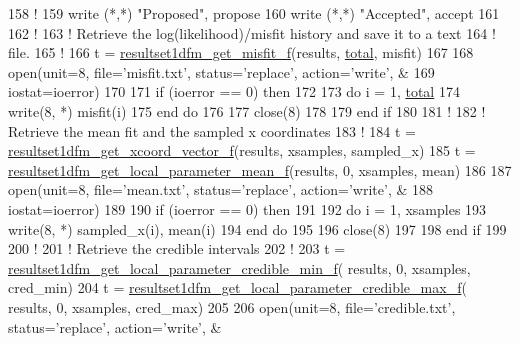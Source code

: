 \begin{DoxyCodeInclude}
158 \textcolor{comment}{!}
159 \textcolor{keyword}{write} (*,*) \textcolor{stringliteral}{"Proposed"}, propose
160 \textcolor{keyword}{write} (*,*) \textcolor{stringliteral}{"Accepted"}, accept
161 
162 \textcolor{comment}{!}
163 \textcolor{comment}{! Retrieve the log(likelihood)/misfit history and save it to a text}
164 \textcolor{comment}{! file.}
165 \textcolor{comment}{!}
166 t = \hyperlink{resultset1dfm_8c_aefdeb8e7e1fce2390b1c954f87351487}{resultset1dfm\_get\_misfit\_f}(results, \hyperlink{rjmcmcf__mpi_8h_a1829e955eab35ef63200105c2de1ad94}{total}, misfit)
167 
168 \textcolor{keyword}{open}(unit=8, file=\textcolor{stringliteral}{'misfit.txt'}, status=\textcolor{stringliteral}{'replace'}, action=\textcolor{stringliteral}{'write'}, &
169      iostat=ioerror)
170 
171 \textcolor{keywordflow}{if} (ioerror == 0) \textcolor{keywordflow}{then}
172 
173 \textcolor{keywordflow}{do} i = 1, \hyperlink{rjmcmcf__mpi_8h_a1829e955eab35ef63200105c2de1ad94}{total}
174    \textcolor{keyword}{write}(8, *) misfit(i)
175 \textcolor{keywordflow}{end do}
176 
177 \textcolor{keyword}{close}(8)
178 
179 \textcolor{keywordflow}{end if}
180 
181 \textcolor{comment}{!}
182 \textcolor{comment}{! Retrieve the mean fit and the sampled x coordinates}
183 \textcolor{comment}{!}
184 t = \hyperlink{resultset1dfm_8c_a45917b3be743e2d8371de4ff6e133d1b}{resultset1dfm\_get\_xcoord\_vector\_f}(results, xsamples, sampled\_x)
185 t = \hyperlink{resultset1dfm_8c_a91912167e17237245756603748780118}{resultset1dfm\_get\_local\_parameter\_mean\_f}(results, 0, xsamples, 
      mean)
186 
187 \textcolor{keyword}{open}(unit=8, file=\textcolor{stringliteral}{'mean.txt'}, status=\textcolor{stringliteral}{'replace'}, action=\textcolor{stringliteral}{'write'}, &
188      iostat=ioerror)
189 
190 \textcolor{keywordflow}{if} (ioerror == 0) \textcolor{keywordflow}{then}
191 
192 \textcolor{keywordflow}{do} i = 1, xsamples
193    \textcolor{keyword}{write}(8, *) sampled\_x(i), mean(i)
194 \textcolor{keywordflow}{end do}
195 
196 \textcolor{keyword}{close}(8)
197 
198 \textcolor{keywordflow}{end if}
199 
200 \textcolor{comment}{!}
201 \textcolor{comment}{! Retrieve the credible intervals}
202 \textcolor{comment}{!}
203 t = \hyperlink{resultset1dfm_8c_a000b6cf3af1c74904153e35dbf40d008}{resultset1dfm\_get\_local\_parameter\_credible\_min\_f}(
      results, 0, xsamples, cred\_min)
204 t = \hyperlink{resultset1dfm_8c_a904242247821dcb00982fa4c9fa3db00}{resultset1dfm\_get\_local\_parameter\_credible\_max\_f}(
      results, 0, xsamples, cred\_max)
205 
206 \textcolor{keyword}{open}(unit=8, file=\textcolor{stringliteral}{'credible.txt'}, status=\textcolor{stringliteral}{'replace'}, action=\textcolor{stringliteral}{'write'}, &

\end{DoxyCodeInclude}

